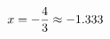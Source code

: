 \documentclass[preview]{standalone}
\begin{document}
\begin{align*}
\special{dvisvgm:raw <g id='unique000'>}x = - \frac{4}{3} \approx -1.333\special{dvisvgm:raw </g>}
\end{align*}
\end{document}
